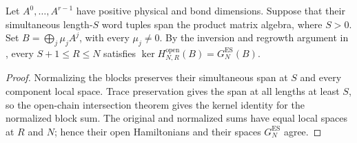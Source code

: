 \begin{lemma}
    \label{thm:block_open_kernel_simultaneous_injectivity}
    \leanok
    Let $A^0,\ldots,A^{r-1}$ have positive physical and bond dimensions.
    Suppose that their simultaneous length-$S$ word tuples span the product
    matrix algebra, where $S>0$. Set $B=\bigoplus_j\mu_jA^j$, with
    every $\mu_j\neq0$. By the inversion and regrowth argument in
    \cite[Section~IV.C, lines~2114--2129]{Cirac2021Matrix}, every
    $S+1\leq R\leq N$ satisfies
    $\ker H^{\mathrm{open}}_{N,R}(B)=G_N^{\mathrm{ES}}(B)$.
\end{lemma}
\begin{proof}
    \leanok
    Normalizing the blocks preserves their simultaneous span at $S$
    and every component local space. Trace preservation gives the span
    at all lengths at least $S$, so the open-chain intersection theorem
    gives the kernel identity for the normalized block sum. The original
    and normalized sums have equal local spaces at $R$ and $N$; hence
    their open Hamiltonians and their spaces $G_N^{\mathrm{ES}}$ agree.
\end{proof}

